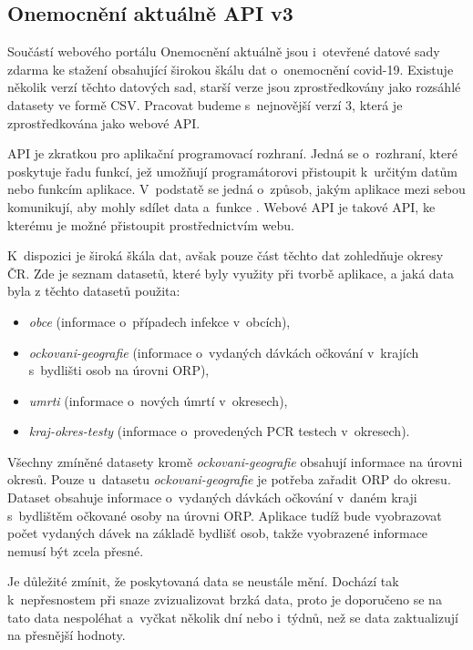 \subsection{Onemocnění aktuálně API v3}
\label{sec:onemocneni-aktualne}
Součástí webového portálu Onemocnění aktuálně jsou i~otevřené datové sady zdarma ke stažení obsahující širokou škálu dat o~onemocnění covid-19. Existuje několik verzí těchto datových sad, starší verze jsou zprostředkovány jako rozsáhlé datasety ve formě CSV. Pracovat budeme s~nejnovější verzí 3, která je zprostředkována jako webové API.

API je zkratkou pro aplikační programovací rozhraní. Jedná se o~rozhraní, které poskytuje řadu funkcí, jež umožňují programátorovi přistoupit k~určitým datům nebo funkcím aplikace. V~podstatě se jedná o~způsob, jakým aplikace mezi sebou komunikují, aby mohly sdílet data a~funkce \cite{api-definice}. Webové API je takové API, ke kterému je možné přistoupit prostřednictvím webu.

K~dispozici je široká škála dat, avšak pouze část těchto dat zohledňuje okresy ČR. Zde je seznam datasetů, které byly využity při tvorbě aplikace, a jaká data byla z těchto datasetů použita:
\begin{itemize}
    \item \emph{obce} (informace o~případech infekce v~obcích),
    \item \emph{ockovani-geografie} (informace o~vydaných dávkách očkování v~krajích s~bydlišti osob na úrovni ORP),
    \item \emph{umrti} (informace o~nových úmrtí v~okresech),
    \item \emph{kraj-okres-testy} (informace o~provedených PCR testech v~okresech).
\end{itemize}

Všechny zmíněné datasety kromě \emph{ockovani-geografie} obsahují informace na úrovni okresů. Pouze u~datasetu \emph{ockovani-geografie} je potřeba zařadit ORP do okresu. Dataset obsahuje informace o~vydaných dávkách očkování v~daném kraji s~bydlištěm očkované osoby na úrovni ORP. Aplikace tudíž bude vyobrazovat počet vydaných dávek na základě bydlišť osob, takže vyobrazené informace nemusí být zcela přesné.

Je důležité zmínit, že poskytovaná data se neustále mění. Dochází tak k~nepřesnostem při snaze zvizualizovat brzká data, proto je doporučeno 
se na tato data nespoléhat a~vyčkat několik dní nebo i~týdnů, než se data zaktualizují na přesnější hodnoty.

